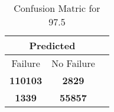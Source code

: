 \begin{table}[] 
\caption{Confusion Matric for 97.5} 
\label{Table: Prediction Accuracy-DMD97.5OnlySunEKF-combinationReflection-Reflection} 
\centering 
\begin{tabular} 
 {@{}ccc@{}} 
\toprule 
\multicolumn{2}{c}{\textbf{Predicted}}
 \\ \midrule 
\multicolumn{1}{|c|}{Failure} & 
\multicolumn{1}{c|}{No Failure}
 \\ \midrule 
\multicolumn{1}{|c|}{\color{green}\textbf{110103}} & 
\multicolumn{1}{c|}{\color{red}\textbf{2829}}
 \\ \midrule 
\multicolumn{1}{|c|}{\color{red}\textbf{1339}} & 
\multicolumn{1}{c|}{\color{green}\textbf{55857}}
 \\ \bottomrule 
\end{tabular} 
\end{table} 
